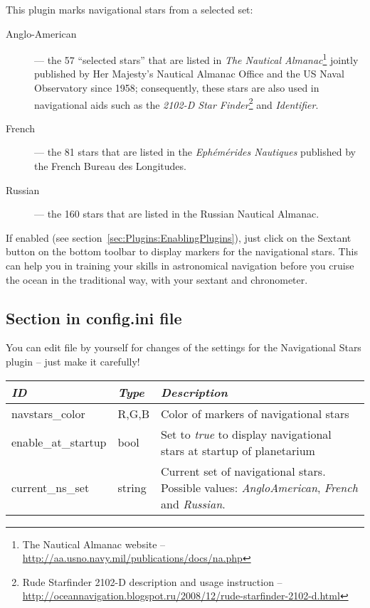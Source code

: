 \noindent This plugin marks navigational stars from a selected set:
\begin{description}
	\item[Anglo-American] --- the 57 ``selected stars'' that are listed in \emph{The Nautical Almanac}\footnote{The Nautical Almanac
		website -- \url{http://aa.usno.navy.mil/publications/docs/na.php}} jointly published by Her Majesty's Nautical Almanac Office and the US Naval Observatory since 1958; consequently, these stars are also used in navigational aids such as the \emph{2102-D Star Finder}\footnote{Rude Starfinder 2102-D
		description and usage instruction --
		\url{http://oceannavigation.blogspot.ru/2008/12/rude-starfinder-2102-d.html}} and \emph{Identifier}. 
	\item[French] --- the 81 stars that are listed in the \emph{Ephémérides Nautiques} published by the French Bureau des Longitudes.
	\item[Russian] --- the 160 stars that are listed in the Russian Nautical Almanac.
\end{description}
If enabled (see section~\ref{sec:Plugins:EnablingPlugins}), just click
on the Sextant button  on
the bottom toolbar to display markers for the navigational stars. This
can help you in training your skills in astronomical navigation before
you cruise the ocean in the traditional way, with your sextant and
chronometer.


\subsection{Section  in config.ini file}

You can edit  file by yourself for changes of the
settings for the Navigational Stars plugin -- just make it carefully!

\noindent%
\begin{tabularx}{\textwidth}{l|l|X}\toprule
\emph{ID}			& \emph{Type} 	& \emph{Description}\\\midrule
navstars\_color 	& R,G,B 		& Color of markers of navigational stars  \\
enable\_at\_startup & bool 		    & Set to \emph{true} to display navigational stars at startup of planetarium  \\
current\_ns\_set	& string		& Current set of navigational stars. Possible values: \emph{AngloAmerican}, \emph{French} and \emph{Russian}. \\
\bottomrule
\end{tabularx}


